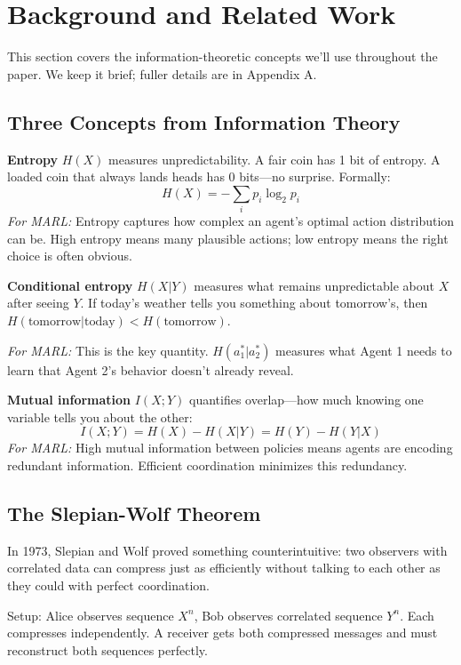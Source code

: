 \documentclass[10pt, letterpaper]{article}
\begin{document}
\section{Background and Related Work}
\label{sec:background}

This section covers the information-theoretic concepts we'll use throughout the paper. We keep it brief; fuller details are in Appendix A.

\subsection{Three Concepts from Information Theory}

\textbf{Entropy} $H(X)$ measures unpredictability. A fair coin has 1 bit of entropy. A loaded coin that always lands heads has 0 bits---no surprise. Formally:
\[H(X) = -\sum_{i} p_i \log_2 p_i\]
\emph{For MARL:} Entropy captures how complex an agent's optimal action distribution can be. High entropy means many plausible actions; low entropy means the right choice is often obvious.

\textbf{Conditional entropy} $H(X|Y)$ measures what remains unpredictable about $X$ after seeing $Y$. If today's weather tells you something about tomorrow's, then $H(\text{tomorrow}|\text{today}) < H(\text{tomorrow})$.

\emph{For MARL:} This is the key quantity. $H(a_1^*|a_2^*)$ measures what Agent 1 needs to learn that Agent 2's behavior doesn't already reveal.

\textbf{Mutual information} $I(X;Y)$ quantifies overlap---how much knowing one variable tells you about the other:
\[I(X;Y) = H(X) - H(X|Y) = H(Y) - H(Y|X)\]
\emph{For MARL:} High mutual information between policies means agents are encoding redundant information. Efficient coordination minimizes this redundancy.

\subsection{The Slepian-Wolf Theorem}

In 1973, Slepian and Wolf proved something counterintuitive: two observers with correlated data can compress just as efficiently without talking to each other as they could with perfect coordination.

Setup: Alice observes sequence $X^n$, Bob observes correlated sequence $Y^n$. Each compresses independently. A receiver gets both compressed messages and must reconstruct both sequences perfectly.
\end{document}
